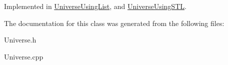 Implemented in \hyperlink{class_universe_using_list_a9cbe5a6b7497005e60131907a3aa8120}{Universe\+Using\+List}, and \hyperlink{class_universe_using_s_t_l_a3716e8b3909153a9604808d4070d7847}{Universe\+Using\+S\+TL}.



The documentation for this class was generated from the following files\+:\begin{DoxyCompactItemize}
\item 
Universe.\+h\item 
Universe.\+cpp\end{DoxyCompactItemize}
